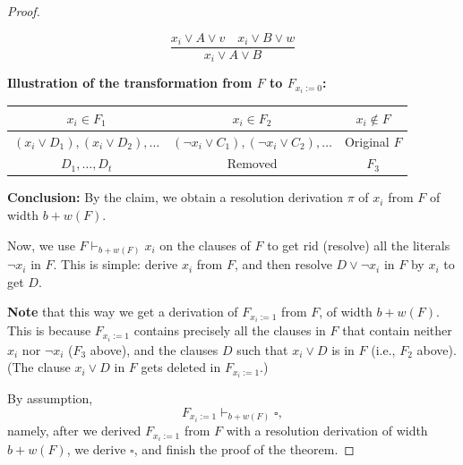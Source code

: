\begin{proof}
\begin{enumerate}
    \[
    \frac{x_i \lor A \lor v \quad x_i \lor B \lor w}{x_i \lor A \lor B}
    \]
\end{enumerate}

\textbf{Illustration of the transformation from $F$ to $F_{x_i := 0}$:}

\begin{center}
    \begin{tabular}{|c|c|c|}
        \hline
        $x_i \in F_1$ & $x_i \in F_2$ & $x_i \notin F$ \\
        \hline
        $(x_i \lor D_1), (x_i \lor D_2), \dots$ & $(\neg x_i \lor C_1), (\neg x_i \lor C_2), \dots$ & Original $F$ \\
        \hline
        $D_1, \dots, D_t$ & Removed & $F_3$ \\
        \hline
    \end{tabular}
\end{center}

\textbf{Conclusion:}  
By the claim, we obtain a resolution derivation $\pi$ of $x_i$ from $F$  
of width $b + w(F)$.


\textbf{ }

Now, we use $F \vdash_{b + w(F)} x_i$ on the clauses of $F$ to get rid (resolve)  
all the literals $\neg x_i$ in $F$.  
This is simple: derive $x_i$ from $F$, and then resolve $D \lor \neg x_i$ in $F$  
by $x_i$ to get $D$.

\textbf{Note} that this way we get a derivation of $F_{x_i := 1}$ from $F$, of width $b + w(F)$.  
This is because $F_{x_i := 1}$ contains precisely all the clauses in $F$ that  
contain neither $x_i$ nor $\neg x_i$ ($F_3$ above), and the clauses $D$  
such that $x_i \lor D$ is in $F$ (i.e., $F_2$ above).  
(The clause $x_i \lor D$ in $F$ gets deleted in $F_{x_i := 1}$.)

By assumption,  
\[
F_{x_i := 1} \vdash_{b + w(F)} \square,
\]
namely, after we derived $F_{x_i := 1}$ from $F$ with a resolution derivation of width $b + w(F)$,  
we derive $\square$, and finish the proof of the theorem.





\mbox{}
\end{proof}


